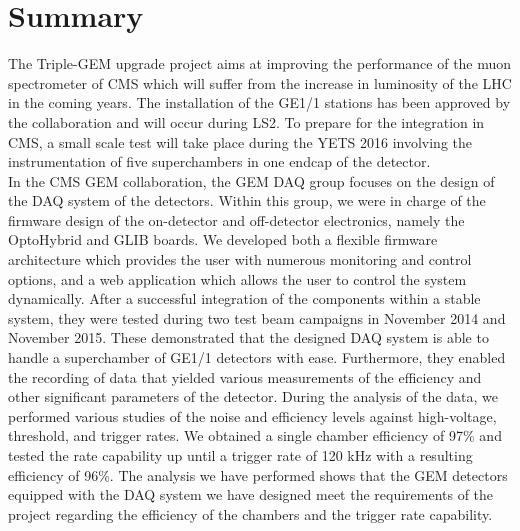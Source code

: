 \chapter{Summary}
\label{chap:II-7-summary}

  The Triple-GEM upgrade project aims at improving the performance of the muon spectrometer of CMS which will suffer from the increase in luminosity of the LHC in the coming years. The installation of the GE1/1 stations has been approved by the collaboration and will occur during LS2. To prepare for the integration in CMS, a small scale test will take place during the YETS 2016 involving the instrumentation of five superchambers in one endcap of the detector. \\

  In the CMS GEM collaboration, the GEM DAQ group focuses on the design of the DAQ system of the detectors. Within this group, we were in charge of the firmware design of the on-detector and off-detector electronics, namely the OptoHybrid and GLIB boards. We developed both a flexible firmware architecture which provides the user with numerous monitoring and control options, and a web application which allows the user to control the system dynamically. After a successful integration of the components within a stable system, they were tested during two test beam campaigns in November 2014 and November 2015. These demonstrated that the designed DAQ system is able to handle a superchamber of GE1/1 detectors with ease. Furthermore, they enabled the recording of data that yielded various measurements of the efficiency and other significant parameters of the detector. During the analysis of the data, we performed various studies of the noise and efficiency levels against high-voltage, threshold, and trigger rates. We obtained a single chamber efficiency of 97\% and tested the rate capability up until a trigger rate of 120 kHz with a resulting efficiency of 96\%. The analysis we have performed shows that the GEM detectors equipped with the DAQ system we have designed meet the requirements of the project regarding the efficiency of the chambers and the trigger rate capability. \\

